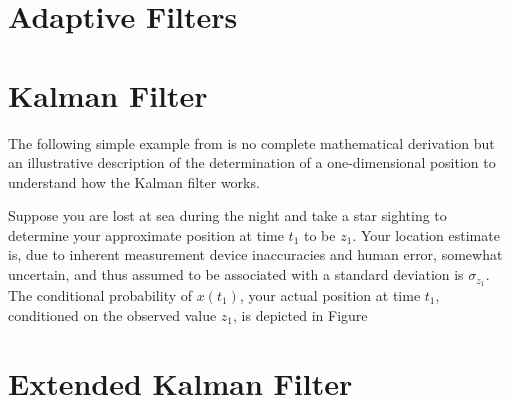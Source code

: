 \section{Adaptive Filters}

 

\section{Kalman Filter}

The following simple example from \cite{Maybeck79} is no complete mathematical derivation but an illustrative description of the determination of a one-dimensional position to understand how the Kalman filter works.

Suppose you are lost at sea during the night and take a star sighting to determine your approximate position at time $t_1$ to be $z_1$. Your location estimate is, due to inherent measurement device inaccuracies and human error, somewhat uncertain, and thus assumed to be associated with a standard deviation is $\sigma_{z_1}$. The conditional probability of $x(t_1)$, your actual position at time $t_1$, conditioned on the observed value $z_1$, is depicted in Figure 


\section{Extended Kalman Filter}


